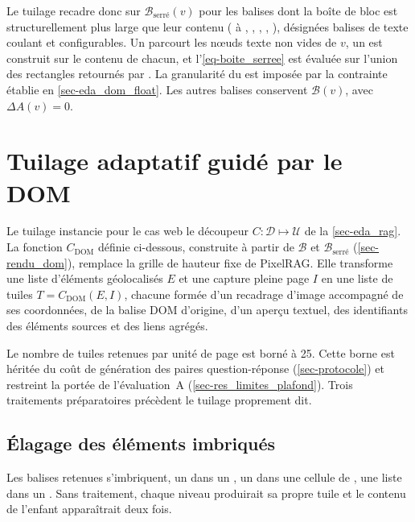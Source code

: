 Le tuilage recadre donc sur $\mathcal{B}_{\text{serré}}(v)$ pour les balises
dont la boîte de bloc est structurellement plus large que leur contenu
( à , , , , ),
désignées balises de texte coulant et configurables. Un 
parcourt les nœuds texte non vides de $v$, un  est construit sur le
contenu de chacun, et l'\cref{eq-boite_serree} est évaluée sur l'union des
rectangles retournés par . La granularité du 
est imposée par la contrainte établie en \cref{sec-eda_dom_float}. Les autres
balises conservent $\mathcal{B}(v)$, avec $\Delta A(v) = 0$.

\section{Tuilage adaptatif guidé par le DOM}
\label{sec-tuilage}

Le tuilage instancie pour le cas web le découpeur
$C : \mathcal{D} \mapsto \mathcal{U}$ de la \cref{sec-eda_rag}. La fonction
$C_{\text{DOM}}$ définie ci-dessous, construite à partir de $\mathcal{B}$ et
$\mathcal{B}_{\text{serré}}$ (\cref{sec-rendu_dom}), remplace la grille de
hauteur fixe de PixelRAG. Elle transforme une liste d'éléments géolocalisés $E$
et une capture pleine page $I$ en une liste de tuiles
$T = C_{\text{DOM}}(E, I)$, chacune formée d'un recadrage d'image accompagné de
ses coordonnées, de la balise DOM d'origine, d'un aperçu textuel, des
identifiants des éléments sources et des liens agrégés.

Le nombre de tuiles retenues par unité de page est borné à \num{25}. Cette
borne est héritée du coût de génération des paires question-réponse
(\cref{sec-protocole}) et restreint la portée de l'évaluation~A
(\cref{sec-res_limites_plafond}). Trois traitements préparatoires précèdent le
tuilage proprement dit.

\subsection{Élagage des éléments imbriqués}
\label{sec-tuilage_elagage}

Les balises retenues s'imbriquent, un  dans un , un
 dans une cellule de , une liste  dans un
. Sans traitement, chaque niveau produirait sa propre tuile
et le contenu de l'enfant apparaîtrait deux fois.

